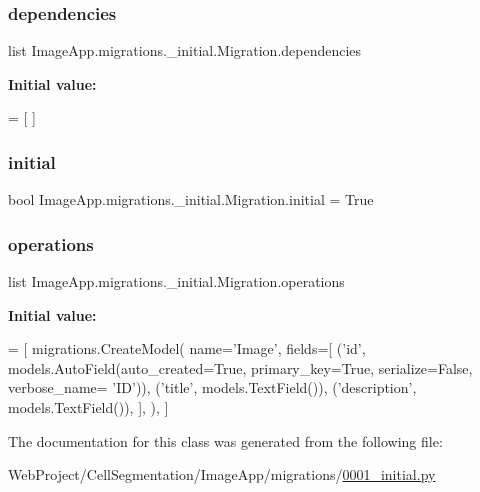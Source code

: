 \subsubsection{\texorpdfstring{dependencies}{dependencies}}
{\footnotesize\ttfamily list Image\+App.\+migrations.\+\_\+initial.\+Migration.\+dependencies\hspace{0.3cm}{\ttfamily [static]}}

{\bfseries Initial value\+:}
\begin{DoxyCode}
=  [
    ]
\end{DoxyCode}
\mbox{\label{class_image_app_1_1migrations_1_10001__initial_1_1_migration_ab7c1550e482a827afc880d61aef3d582}} 
\subsubsection{\texorpdfstring{initial}{initial}}
{\footnotesize\ttfamily bool Image\+App.\+migrations.\+\_\+initial.\+Migration.\+initial = True\hspace{0.3cm}{\ttfamily [static]}}

\mbox{\label{class_image_app_1_1migrations_1_10001__initial_1_1_migration_a3e24a94fd90e7788a2bddffc7a529b16}} 
\subsubsection{\texorpdfstring{operations}{operations}}
{\footnotesize\ttfamily list Image\+App.\+migrations.\+\_\+initial.\+Migration.\+operations\hspace{0.3cm}{\ttfamily [static]}}

{\bfseries Initial value\+:}
\begin{DoxyCode}
=  [
        migrations.CreateModel(
            name=\textcolor{stringliteral}{'Image'},
            fields=[
                (\textcolor{stringliteral}{'id'}, models.AutoField(auto\_created=\textcolor{keyword}{True}, primary\_key=\textcolor{keyword}{True}, serialize=\textcolor{keyword}{False}, verbose\_name=\textcolor{stringliteral}{
      'ID'})),
                (\textcolor{stringliteral}{'title'}, models.TextField()),
                (\textcolor{stringliteral}{'description'}, models.TextField()),
            ],
        ),
    ]
\end{DoxyCode}


The documentation for this class was generated from the following file\+:\begin{DoxyCompactItemize}
\item 
Web\+Project/\+Cell\+Segmentation/\+Image\+App/migrations/\mbox{\hyperlink{0001__initial_8py}{0001\+\_\+initial.\+py}}\end{DoxyCompactItemize}
